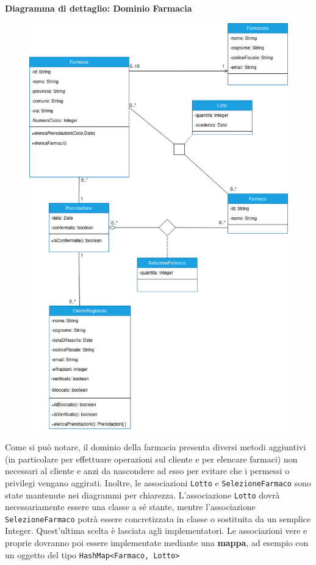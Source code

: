 \textbf{Diagramma di dettaglio: Dominio Farmacia}
\begin{figure}[h!]
    \begin{center}
        \includegraphics[scale=0.56]{immagini/DominioFarmacia-progettazione.jpg}
    \end{center}
\end{figure}

\newpage

Come si può notare, il dominio della farmacia presenta diversi metodi aggiuntivi (in particolare per effettuare operazioni sul cliente e per elencare farmaci)
non necessari al cliente e anzi da nascondere ad esso per evitare che i permessi o privilegi vengano aggirati.
Inoltre, le associazioni \texttt{Lotto} e \texttt{SelezioneFarmaco} sono state mantenute nei diagrammi per chiarezza. 
L'associazione \texttt{Lotto} dovrà necessariamente essere una classe a sé stante,
mentre l'associazione \texttt{SelezioneFarmaco} potrà essere concretizzata in classe o sostituita da un semplice Integer. Quest'ultima scelta è lasciata agli implementatori.
Le associazioni vere e proprie dovranno poi essere implementate mediante una \textbf{mappa}, ad esempio con un oggetto del tipo \mbox{\texttt{HashMap<Farmaco, Lotto>}}
\vspace{2em}

